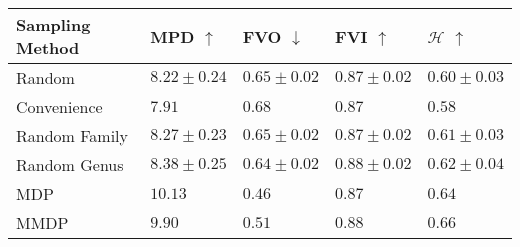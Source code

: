 \begin{tabular}{lllll}
    \toprule
    \textbf{Sampling Method} & \textbf{MPD} $\uparrow$ & \textbf{FVO} $\downarrow$ & \textbf{FVI} $\uparrow$ & $\mathcal{H}$ $\uparrow$ \\
    \midrule
    Random                   & $8.22 \pm0.24$          & $0.65 \pm0.02$            & $0.87 \pm0.02$          & $0.60 \pm0.03$           \\
    Convenience              & $7.91$                  & $0.68$                    & $0.87$                  & $0.58$                   \\
    Random Family            & $8.27 \pm0.23$          & $0.65 \pm0.02$            & $0.87 \pm0.02$          & $0.61 \pm0.03$           \\
    Random Genus             & $8.38 \pm0.25$          & $0.64 \pm0.02$            & $0.88 \pm0.02$          & $0.62 \pm0.04$           \\
    \midrule
    MDP                      & \textbf{$10.13$}        & \textbf{$0.46$}           & $0.87$                  & $0.64$                   \\
    MMDP                     & $9.90$                  & $0.51$                    & $0.88$                  & \textbf{$0.66$}          \\
    \bottomrule
\end{tabular}